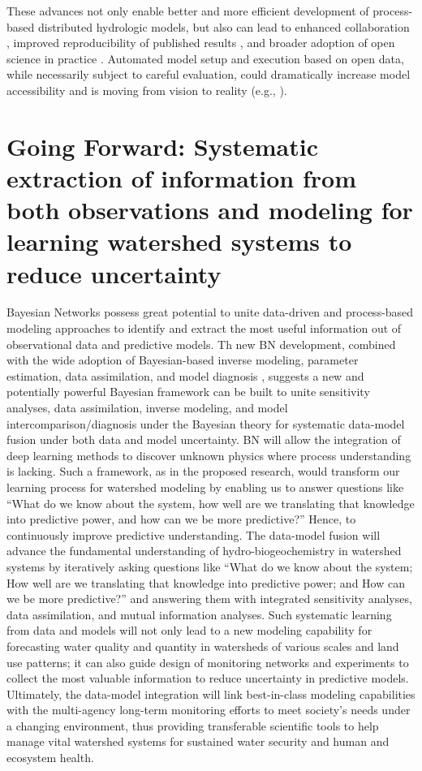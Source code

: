 \documentclass[preprint,review, 12pt]{elsarticle}
\begin{document}
These advances not only enable better and more efficient development of process-based distributed hydrologic models, but also can lead to enhanced collaboration \citep{Bandaragoda2019}, improved reproducibility of published results \citep{Stagge2019}, and broader adoption of open science in practice \citep{Yu2016}. Automated model setup and execution based on open data, while necessarily subject to careful evaluation, could dramatically increase model accessibility and is moving from vision to reality (e.g., \cite{Starn2018, Lewis2018}).


\section{Going Forward: Systematic extraction of information from both observations and modeling for learning watershed systems to reduce uncertainty}
    
Bayesian Networks possess great potential to unite data-driven and process-based modeling approaches to identify and extract the most useful information out of observational data and predictive models. Th new BN development, combined with the wide adoption of Bayesian-based inverse modeling, parameter estimation, data assimilation, and model diagnosis \citep{Rubin2010b, Chen2013a, Chen2012a, Nearing2018c, Liu2007b, Gupta2008, Over, Simmons2016, Ye2004, Joseph2013, Gelman2014c, Nearing2016}, suggests a new and potentially powerful Bayesian framework can be built to unite sensitivity analyses, data assimilation, inverse modeling, and model intercomparison/diagnosis under the Bayesian theory for systematic data-model fusion under both data and model uncertainty. BN will allow the integration of deep learning methods \citep{Sun2019, Sun2018, Shenc, Gentine2018, Reichstein2019} to discover unknown physics where process understanding is lacking. Such a framework, as in the proposed research, would transform our learning process for watershed modeling by enabling us to answer questions like “What do we know about the system, how well are we translating that knowledge into predictive power, and how can we be more predictive?” Hence, to continuously improve predictive understanding. The data-model fusion will advance the fundamental understanding of hydro-biogeochemistry in watershed systems by iteratively asking questions like “What do we know about the system; How well are we translating that knowledge into predictive power; and How can we be more predictive?” and answering them with integrated sensitivity analyses, data assimilation, and mutual information analyses. Such systematic learning from data and models will not only lead to a new modeling capability for forecasting water quality and quantity in watersheds of various scales and land use patterns; it can also guide design of monitoring networks and experiments to collect the most valuable information to reduce uncertainty in predictive models. Ultimately, the data-model integration will link best-in-class modeling capabilities with the multi-agency long-term monitoring efforts to meet society’s needs under a changing environment, thus providing transferable scientific tools to help manage vital watershed systems for sustained water security and human and ecosystem health.
\end{document}
